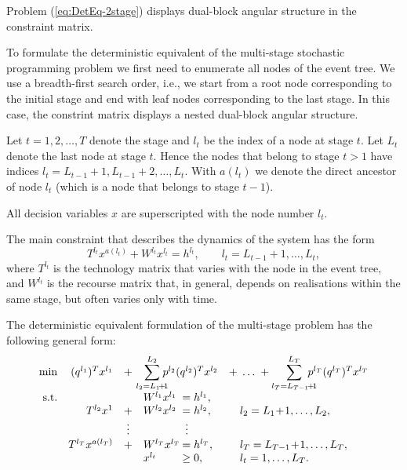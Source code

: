 Problem (\ref{eq:DetEq-2stage}) displays dual-block angular structure
in the constraint matrix.



To formulate the deterministic equivalent of the multi-stage 
stochastic programming problem we first need to enumerate all nodes 
of the event tree. We use a breadth-first 
search order, i.e., we start from a root node corresponding 
to the initial stage and end with leaf nodes corresponding 
to the last stage. In this case, the constrint matrix displays
a nested dual-block angular structure.

Let $t = 1,2,\ldots,T$ denote the stage and $l_t$ be the index of a 
node at stage $t$.
Let $L_t$ denote the last node at stage $t$. Hence 
the nodes that belong to stage $t > 1$ have indices 
$l_t = L_{t-1} \! + \! 1, L_{t-1} \! + \! 2, \dots, L_t$. 
With $a(l_t)$ we denote the direct ancestor of node $l_t$ (which is a 
node that belongs to stage $t-1$).


All decision variables $x$ are superscripted with the node number 
$l_t$.

The main constraint that describes the dynamics of the system has the form 
\[
  T^{l_t}x^{a(l_t)} +W^{l_t}x^{l_t} =h^{l_t}, \qquad l_t =L_{t-1}+1,\dots,L_t,
\]
%
where $T^{l_t}$ is the technology matrix that varies 
with the node in the event tree, and $W^{l_t}$ is the recourse
matrix that, in general, depends on realisations within the same stage,
but often varies only with time.

The deterministic equivalent formulation of the multi-stage 
problem has the following general form:
\begin{equation}
  \begin{array}{rrclll}
    \min & (q^{l_1})^T x^{l_1} & + & \!\!\!\!{\displaystyle \sum_{l_2=L_1 \!+\! 1}^{L_2}} \!\!\! p^{l_2} (q^{l_2})^T x^{l_2} && \!\!\!\!\!\!  + \; \ldots \; + {\displaystyle \sum_{l_T = L_{T-1} \! + \! 1}^{L_T}} \!\!\!\!\! p^{l_T} (q^{l_T})^T x^{l_T} \\
    \mbox{s.t.} & & & W^{l_1} x^{l_1} & \hspace{-1.5cm} = h^{l_1}, \\
    & T^{l_2} x^1 & + & W^{l_2} x^{l_2} & \hspace{-1.5cm} = h^{l_2}, & l_2 = L_1 \!+\! 1,\dots,L_2, \\
    & & \vdots & & \hspace{-1.4cm} \vdots \\
    & T^{l_T} x^{a(l_T)} & + &  W^{l_T} x^{l_T} & \hspace{-1.5cm} = h^{l_T}, & l_T = L_{T-1} \! + \! 1, \dots, L_T, \\
    & & & x^{l_t} & \hspace{-1.5cm} \geq 0, & l_t = 1,\dots, L_{T}. \\
    \label{DetEquiv}
  \end{array} 
\end{equation}

